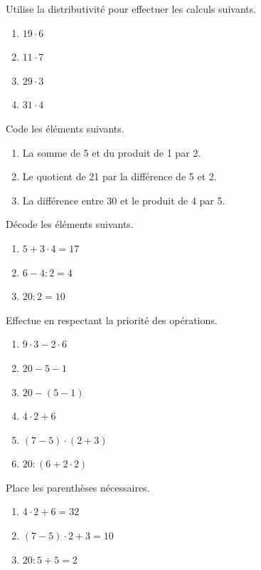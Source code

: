 \documentclass[../../syllabus_1.tex]{subfiles}
\begin{document}
\begin{exercise}
    Utilise la distributivité pour effectuer les calculs suivants.
    \begin{enumerate}[cols=4]
        \item \(19 \cdot 6 \)
        \item \(11 \cdot 7 \)
        \item \(29 \cdot 3 \)
        \item \(31 \cdot 4 \)
    \end{enumerate}
\end{exercise}

\begin{exercise}
    Code les éléments suivants.
    \begin{enumerate}
        \item La somme de 5 et du produit de 1 par 2.
        \item Le quotient de 21 par la différence de 5 et 2.
        \item La différence entre 30 et le produit de 4 par 5.
    \end{enumerate}
\end{exercise}

\begin{exercise}
    Décode les éléments suivants.
    \begin{enumerate}[cols=3]
        \item \(5 + 3 \cdot 4 = 17 \)
        \item \(6 - 4 : 2 = 4 \)
        \item \(20 : 2 = 10 \)
    \end{enumerate}
\end{exercise}

\begin{exercise}
    Effectue en respectant la priorité des opérations.
    \begin{enumerate}[cols=3]
        \item \(9 \cdot 3 - 2 \cdot 6 \)
        \item \(20 - 5 - 1 \)
        \item \(20 - (5 - 1) \)
        \item \(4 \cdot 2 + 6 \)
        \item \((7 - 5) \cdot (2 + 3) \)
        \item \(20 : (6 + 2 \cdot 2) \)
    \end{enumerate}
\end{exercise}

\begin{exercise}
    Place les parenthèses nécessaires.
    \begin{enumerate}[cols=3]
        \item \(4 \cdot 2 + 6 = 32 \)
        \item \((7 - 5) \cdot 2 + 3 = 10 \)
        \item \(20 : 5 + 5 = 2 \)
    \end{enumerate}
\end{exercise}
\end{document}
